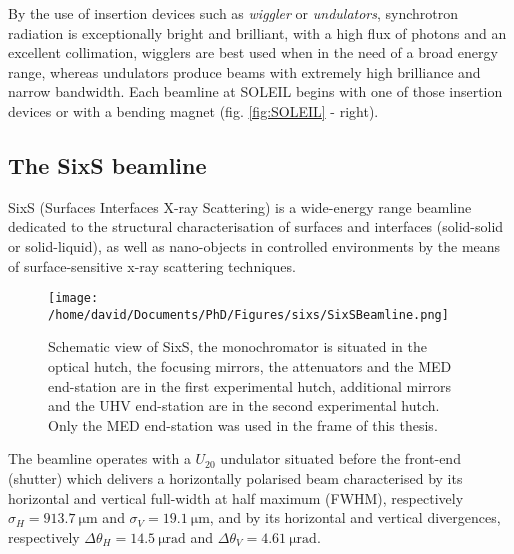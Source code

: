 By the use of insertion devices such as \textit{wiggler} or \textit{undulators}, synchrotron radiation is exceptionally bright and brilliant, with a high flux of photons and an excellent collimation, wigglers are best used when in the need of a broad energy range, whereas undulators produce beams with extremely high brilliance and narrow bandwidth.
Each beamline at SOLEIL begins with one of those insertion devices or with a bending magnet (fig. \ref{fig:SOLEIL} - right).

\subsection{The SixS beamline}

SixS (Surfaces Interfaces X-ray Scattering) is a wide-energy range beamline dedicated to the structural characterisation of surfaces and interfaces (solid-solid or solid-liquid), as well as nano-objects in controlled environments by the means of surface-sensitive x-ray scattering techniques.

\begin{figure}[!htb]
    \centering
    \texttt{[image: /home/david/Documents/PhD/Figures/sixs/SixSBeamline.png]}
    \caption{
		Schematic view of SixS, the monochromator is situated in the optical hutch, the focusing mirrors, the attenuators and the MED end-station are in the first experimental hutch, additional mirrors and the UHV end-station are in the second experimental hutch.
		Only the MED end-station was used in the frame of this thesis.
    }
    \label{fig:SixSBeamline}
\end{figure}

The beamline operates with a $U_{20}$ undulator situated before the front-end (shutter) which delivers a horizontally polarised beam characterised by its horizontal and vertical full-width at half maximum (FWHM), respectively $\sigma_H = \qty{913.7}{\um}$ and $\sigma_V = \qty{19.1}{\um}$, and by its horizontal and vertical divergences, respectively $\Delta\theta_H = \qty{14.5}{\micro\radian}$ and $\Delta\theta_V = \qty{4.61}{\micro\radian}$.

